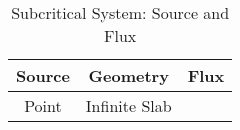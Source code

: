 \documentclass{school-22.211-notes}
\begin{document}
  \begin{table}
    \centering
    \begin{tabular}{|c|c|c|} \hline
      Source & Geometry & Flux \\ \hline \hline
      Point & Infinite Slab & \\ \hline
    \end{tabular}
    \caption{Subcritical System: Source and Flux} 
  \end{table}
  
  
\end{document}
